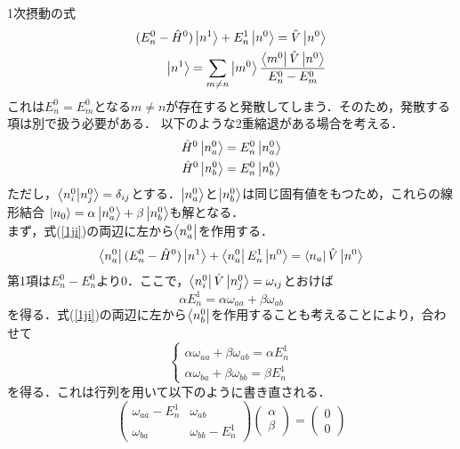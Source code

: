 \documentclass{report}
\begin{document}
  1次摂動の式
  \begin{align}
    \label{1ji}
    (E_n^0-\hat{H}^0)\ket{n^1}+E_n^1\ket{n^0}=\hat{V}\ket{n^0}\\
    \ket{n^1}=\sum_{m\ne n}\ket{m^0}\frac{\bra{m^0}\hat{V}\ket{n^0}}{E_n^0-E_m^0}
  \end{align}
  これは$E_n^0=E_m^0$となる$m\ne n$が存在すると発散してしまう．そのため，発散する項は別で扱う必要がある．
  以下のような2重縮退がある場合を考える．
  \begin{align}
    \hat{H}^0\ket{n_a^0}&=E_n^0\ket{n_a^0}\\
    \hat{H}^0\ket{n_b^0}&=E_n^0\ket{n_b^0}
  \end{align}
  ただし，$\braket{n_i^0}{n_j^0}=\delta_{ij}$とする．$\ket{n_a^0}$と$\ket{n_b^0}$は同じ固有値をもつため，これらの線形結合
  $\ket{n_0}=\alpha\ket{n_a^0}+\beta\ket{n_b^0}$も解となる．\\
  まず，式(\ref{1ji})の両辺に左から$\bra{n_a^0}$を作用する．
  \begin{equation}
    \bra{n_a^0}(E_n^0-\hat{H}^0)\ket{n^1}+\bra{n_a^0}E_n^1\ket{n^0}=\bra{n_a}\hat{V}\ket{n^0}
  \end{equation}
  第1項は$E_n^0-E_n^0$より0．ここで，$\bra{n_i^0}\hat{V}\ket{n_j^0}=\omega_{ij}$とおけば
  \begin{equation}
    \alpha E_n^1=\alpha\omega_{aa}+\beta\omega_{ab}
  \end{equation}
  を得る．式(\ref{1ji})の両辺に左から$\bra{n_b^0}$を作用することも考えることにより，合わせて
  \begin{equation}
    \begin{cases}
      \alpha\omega_{aa}+\beta\omega_{ab}=\alpha E_n^1\\
      \alpha\omega_{ba}+\beta\omega_{bb}=\beta E_n^1
    \end{cases}
  \end{equation}
  を得る．これは行列を用いて以下のように書き直される．
  \begin{equation}
    \label{gyouretu}
    \begin{pmatrix}
      \omega_{aa}-E_n^1&\omega_{ab}\\
      \omega_{ba}&\omega_{bb}-E_n^1
    \end{pmatrix}
    \begin{pmatrix}
      \alpha\\
      \beta
    \end{pmatrix}
    =
    \begin{pmatrix}
      0\\0
    \end{pmatrix}
  \end{equation}
\end{document}
